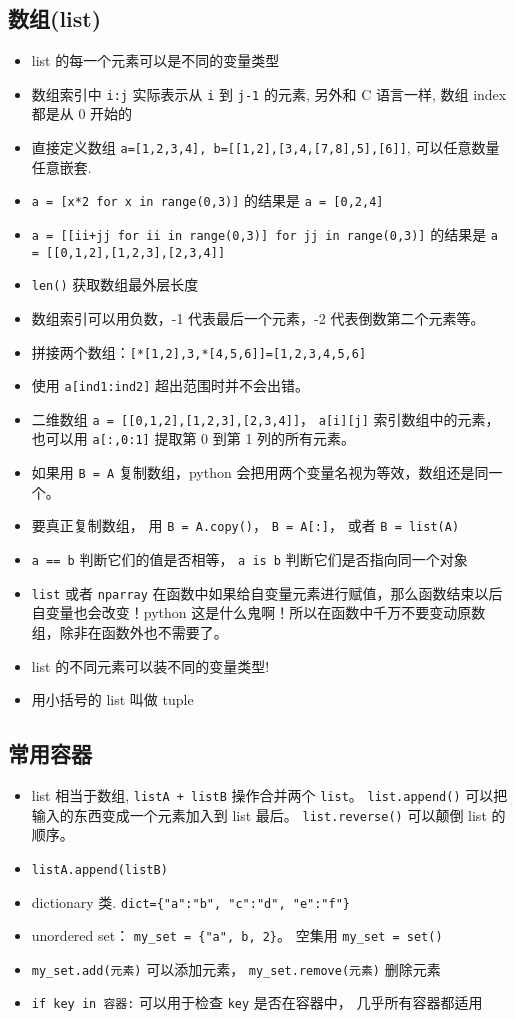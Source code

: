 \subsection{数组(list)}
\begin{itemize}
\item list 的每一个元素可以是不同的变量类型
\item 数组索引中 \verb`i:j` 实际表示从 \verb`i` 到 \verb`j-1` 的元素, 另外和 C 语言一样, 数组 index 都是从 0 开始的
\item 直接定义数组 \verb`a=[1,2,3,4], b=[[1,2],[3,4,[7,8],5],[6]]`, 可以任意数量任意嵌套.
\item \verb`a = [x*2 for x in range(0,3)]` 的结果是 \verb`a = [0,2,4]`
\item \verb`a = [[ii+jj for ii in range(0,3)] for jj in range(0,3)]` 的结果是 \verb`a = [[0,1,2],[1,2,3],[2,3,4]]`
\item \verb`len()` 获取数组最外层长度
\item 数组索引可以用负数，-1 代表最后一个元素，-2 代表倒数第二个元素等。
\item 拼接两个数组：\verb`[*[1,2],3,*[4,5,6]]=[1,2,3,4,5,6]`
\item 使用 \verb`a[ind1:ind2]` 超出范围时并不会出错。
\item 二维数组 \verb`a = [[0,1,2],[1,2,3],[2,3,4]]`， \verb`a[i][j]` 索引数组中的元素，也可以用 \verb`a[:,0:1]` 提取第 0 到第 1 列的所有元素。
\item 如果用 \verb`B = A` 复制数组，python 会把用两个变量名视为等效，数组还是同一个。
\item 要真正复制数组， 用 \verb`B = A.copy()`， \verb`B = A[:]`， 或者 \verb`B = list(A)`
\item \verb`a == b` 判断它们的值是否相等， \verb`a is b` 判断它们是否指向同一个对象
\item \verb`list` 或者 \verb`nparray` 在函数中如果给自变量元素进行赋值，那么函数结束以后自变量也会改变！python 这是什么鬼啊！所以在函数中千万不要变动原数组，除非在函数外也不需要了。
\item list 的不同元素可以装不同的变量类型!
\item 用小括号的 list 叫做 tuple
\end{itemize}

\subsection{常用容器}
\begin{itemize}
\item list 相当于数组, \verb`listA + listB` 操作合并两个 \verb`list`。 \verb`list.append()` 可以把输入的东西变成一个元素加入到 list 最后。 \verb`list.reverse()` 可以颠倒 list 的顺序。
\item \verb`listA.append(listB)`
\item dictionary 类.  \verb`dict={"a":"b", "c":"d", "e":"f"}`
\item unordered set： \verb`my_set = {"a", b, 2}`。 空集用 \verb`my_set = set()`
\item \verb`my_set.add(元素)` 可以添加元素， \verb`my_set.remove(元素)` 删除元素
\item \verb`if key in 容器:` 可以用于检查 \verb`key` 是否在容器中， 几乎所有容器都适用
\end{itemize}


